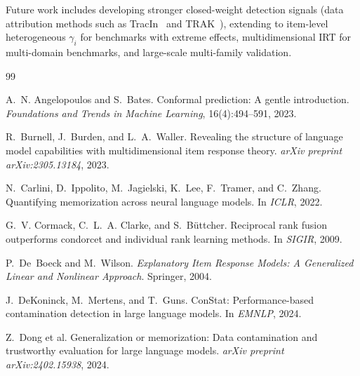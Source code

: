 \documentclass[11pt,a4paper]{article}
\begin{document}
Future work includes developing stronger closed-weight detection signals (data attribution methods such as TracIn~\citep{pruthi2020tracin} and TRAK~\citep{park2023trak}), extending to item-level heterogeneous $\gamma_i$ for benchmarks with extreme effects, multidimensional IRT for multi-domain benchmarks, and large-scale multi-family validation.



\begin{thebibliography}{99}

A.~N. Angelopoulos and S.~Bates.
\newblock Conformal prediction: A gentle introduction.
\newblock \emph{Foundations and Trends in Machine Learning}, 16(4):494--591, 2023.

R.~Burnell, J.~Burden, and L.~A.~Waller.
\newblock Revealing the structure of language model capabilities with multidimensional item response theory.
\newblock \emph{arXiv preprint arXiv:2305.13184}, 2023.

N.~Carlini, D.~Ippolito, M.~Jagielski, K.~Lee, F.~Tramer, and C.~Zhang.
\newblock Quantifying memorization across neural language models.
\newblock In \emph{ICLR}, 2022.

G.~V. Cormack, C.~L.~A. Clarke, and S.~B\"{u}ttcher.
\newblock Reciprocal rank fusion outperforms condorcet and individual rank learning methods.
\newblock In \emph{SIGIR}, 2009.

P.~De~Boeck and M.~Wilson.
\newblock \emph{Explanatory Item Response Models: A Generalized Linear and Nonlinear Approach}.
\newblock Springer, 2004.

J.~DeKoninck, M.~Mertens, and T.~Guns.
\newblock ConStat: Performance-based contamination detection in large language models.
\newblock In \emph{EMNLP}, 2024.

Z.~Dong et al.
\newblock Generalization or memorization: Data contamination and trustworthy evaluation for large language models.
\newblock \emph{arXiv preprint arXiv:2402.15938}, 2024.


\end{thebibliography}
\end{document}
